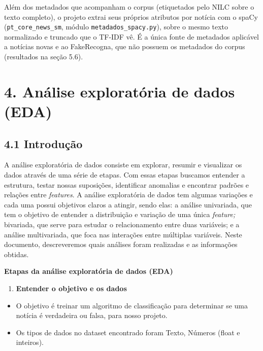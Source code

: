 \documentclass[
  brazilian,
  11pt,
]{article}
\providecommand{\tightlist}{%
  \setlength{\itemsep}{0pt}\setlength{\parskip}{0pt}}
\begin{document}
Além dos metadados que acompanham o corpus (etiquetados pelo NILC sobre o texto completo), o projeto extrai seus próprios atributos por notícia com o spaCy (\texttt{pt\_core\_news\_sm}, módulo \texttt{metadados\_spacy.py}), sobre o mesmo texto normalizado e truncado que o TF-IDF vê. É a única fonte de metadados aplicável a notícias novas e ao FakeRecogna, que não possuem os metadados do corpus (resultados na seção 5.6).

\section{4. Análise exploratória de dados (EDA)}\label{anuxe1lise-exploratuxf3ria-de-dados-eda}

\subsection{4.1 Introdução}\label{introduuxe7uxe3o}

A análise exploratória de dados consiste em explorar, resumir e visualizar os dados através de uma série de etapas. Com essas etapas buscamos entender a estrutura, testar nossas suposições, identificar anomalias e encontrar padrões e relações entre \emph{features}. A análise exploratória de dados tem algumas variações e cada uma possui objetivos claros a atingir, sendo elas: a análise univariada, que tem o objetivo de entender a distribuição e variação de uma única \emph{feature;} bivariada, que serve para estudar o relacionamento entre duas variáveis; e a análise multivariada, que foca nas interações entre múltiplas variáveis. Neste documento, descreveremos quais análises foram realizadas e as informações obtidas.

\textbf{Etapas da análise exploratória de dados (EDA)}

\begin{enumerate}
\def\labelenumi{\arabic{enumi}.}
\tightlist
\item
  \textbf{Entender o objetivo e os dados}
\end{enumerate}

\begin{itemize}
\tightlist
\item
  O objetivo é treinar um algoritmo de classificação para determinar se uma notícia é verdadeira ou falsa, para nosso projeto.
\item
  Os tipos de dados no dataset encontrado foram Texto, Números (float e inteiros).
\end{itemize}
\end{document}
